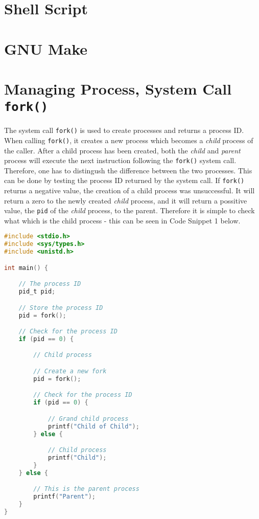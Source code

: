 \documentclass[a4paper,oneside,onecolumn]{article}
\newcommand{\code}[1]{\colorbox{codegray}{\texttt{#1}}}
\begin{document}
\section*{Shell Script}

\section*{GNU Make}

\section*{Managing Process, System Call \code{fork()}}

\noindent
The system call \code{fork()} is used to create processes and returns a process ID. When calling \code{fork()}, it creates a new process which becomes a \textit{child} process of the caller. After a child process has been created, both the \textit{child} and \textit{parent} process will execute the next instruction following the \code{fork()} system call. Therefore, one has to distingush the difference between the two processes.
\newline
This can be done by testing the process ID returned by the system call.
\newline
\newline
If \code{fork()} returns a negative value, the creation of a child process was unsuccessful. It will return a zero to the newly created \textit{child} process, and it will return a possitive value, the \texttt{pid} of the \textit{child} process, to the parent.
\newline
\newline
Therefore it is simple to check what which is the child process - this can be seen in Code Snippet 1 below.
\begin{lstlisting}[language=c, caption=Managing system calls]
#include <stdio.h>
#include <sys/types.h>
#include <unistd.h>

int main() {

    // The process ID
    pid_t pid;

    // Store the process ID
    pid = fork();

    // Check for the process ID
    if (pid == 0) {

        // Child process

        // Create a new fork
        pid = fork();

        // Check for the process ID
        if (pid == 0) {

            // Grand child process
            printf("Child of Child");
        } else {

            // Child process
            printf("Child");
        }
    } else {

        // This is the parent process
        printf("Parent");
    }
}
\end{lstlisting}
\end{document}

